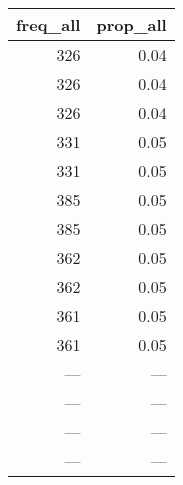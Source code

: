 \begin{tabular}{rr}
  \toprule
 freq\_all & prop\_all \\ 
  \midrule
  326 & 0.04 \\ 
  326 & 0.04 \\ 
  326 & 0.04 \\ 
  331 & 0.05 \\ 
  331 & 0.05 \\ 
  385 & 0.05 \\ 
  385 & 0.05 \\ 
  362 & 0.05 \\ 
  362 & 0.05 \\ 
  361 & 0.05 \\ 
  361 & 0.05 \\ 
  --- & --- \\ 
  --- & --- \\ 
  --- & --- \\ 
  --- & --- \\ 
   \bottomrule
\end{tabular}
